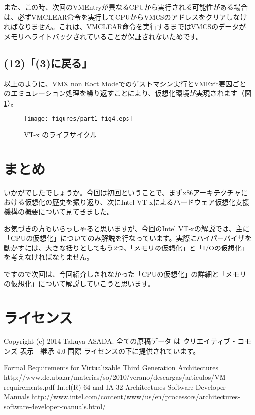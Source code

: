 \documentclass[a4j,12pt]{jarticle}
\begin{document}
また、この時、次回のVMEntryが異なるCPUから実行される可能性がある場合は、必ずVMCLEAR命令を実行してCPUからVMCSのアドレスをクリアしなければなりません。これは、VMCLEAR命令を実行するまではVMCSのデータがメモリへライトバックされていることが保証されないためです。

\subsection*{(12)「(3)に戻る」}
以上のように、VMX non Root Modeでのゲストマシン実行とVMExit要因ごとのエミュレーション処理を繰り返すことにより、仮想化環境が実現されます（図\ref{fig4}）。

\begin{figure}\centering
\texttt{[image: figures/part1\_fig4.eps]}
\caption{VT-x のライフサイクル}
\label{fig4}
\end{figure}

\section{まとめ}
いかがでしたでしょうか。今回は初回ということで、まずx86アーキテクチャにおける仮想化の歴史を振り返り、次にIntel VT-xによるハードウェア仮想化支援機構の概要について見てきました。

お気づきの方もいらっしゃると思いますが、今回のIntel VT-xの解説では、主に「CPUの仮想化」についてのみ解説を行なっています。実際にハイパーバイザを動かすには、大きな括りとしてもう2つ、「メモリの仮想化」と「I/Oの仮想化」を考えなければなりません。

ですので次回は、今回紹介しきれなかった「CPUの仮想化」の詳細と「メモリの仮想化」について解説していこうと思います。

\section{ライセンス}
Copyright (c) 2014 Takuya ASADA.
全ての原稿データ は クリエイティブ・コモンズ 表示 - 継承 4.0 国際 ライセンスの下に提供されています。

\begin{thebibliography}{4}
   Formal Requirements for Virtualizable Third Generation Architectures http://www.dc.uba.ar/materias/so/2010/verano/descargas/articulos/VM-requirements.pdf
   Intel(R) 64 and IA-32 Architectures Software Developer Manuals http://www.intel.com/content/www/us/en/processors/architectures-software-developer-manuals.html/
\end{thebibliography}
\end{document}
